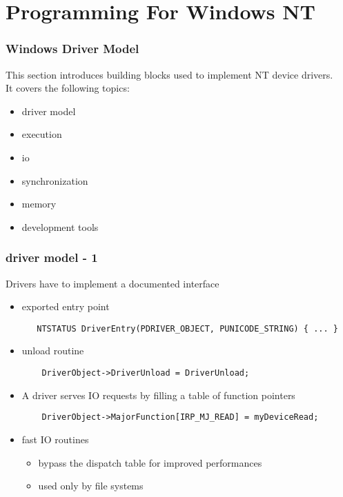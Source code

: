 %
%

\section{Programming For Windows NT}


\begin{frame}
  \frametitle{Windows Driver Model}

 This section introduces building blocks used to implement NT device drivers. \\
 It covers the following topics:
 \begin{itemize}
 \item
   driver model
 \item
   execution
 \item
   io
 \item
   synchronization
 \item
   memory 
 \item
   development tools
 \end{itemize}

\end{frame}


\begin{frame}[containsverbatim]
 \frametitle{driver model - 1}

 Drivers have to implement a documented interface

 \begin{itemize}
  \item exported entry point

  \begin{verbatim}
   NTSTATUS DriverEntry(PDRIVER_OBJECT, PUNICODE_STRING) { ... }
  \end{verbatim}

  \item unload routine
   \begin{verbatim}
    DriverObject->DriverUnload = DriverUnload;
   \end{verbatim}

  \item A driver serves IO requests by filling a table of function pointers
   \begin{verbatim}
    DriverObject->MajorFunction[IRP_MJ_READ] = myDeviceRead;
   \end{verbatim}

  \item fast IO routines
  \begin{itemize}
   \item bypass the dispatch table for improved performances
   \item used only by file systems
  \end{itemize}

 \end{itemize}

\end{frame}

